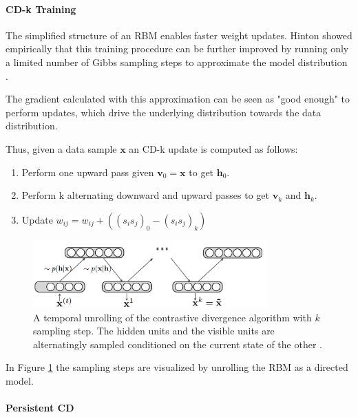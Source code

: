 \paragraph{CD-k Training} \label{c:cdk}

The simplified structure of an RBM enables faster weight updates. 
Hinton showed empirically that this training procedure can be further improved by running only a limited number of Gibbs sampling steps to approximate the model distribution \cite{hinton2002training}.

The gradient calculated with this approximation can be seen as "good enough" to perform updates, which drive the underlying distribution towards the data distribution.

Thus, given a data sample $\textbf{x}$ an CD-k update is computed as follows:
\begin{enumerate}
\item Perform one upward pass given $\textbf{v}_0=\textbf{x}$ to get $\textbf{h}_0$.
\item Perform k alternating downward and upward passes to get $\textbf{v}_k$ and $\textbf{h}_k$.
\item Update $w_{ij} = w_{ij} + ( (s_i s_j)_0 - (s_i s_j)_k ) $ 
\end{enumerate} 

\begin{figure}
	\centering
    	\includegraphics[width=0.8\textwidth]{imgs/cd.png} 
    \caption[A temporal unrolling of the contrastive divergence algorithm.]{A temporal unrolling of the contrastive divergence algorithm with $k$ sampling step. The hidden units and the visible units are alternatingly sampled conditioned on the current state of the other \cite{cdImg}.}
	\label{fig:cd}
\end{figure}

In Figure \ref{fig:cd} the sampling steps are visualized by unrolling the RBM as a directed model.

\paragraph{Persistent CD} \label{c:pcd}

